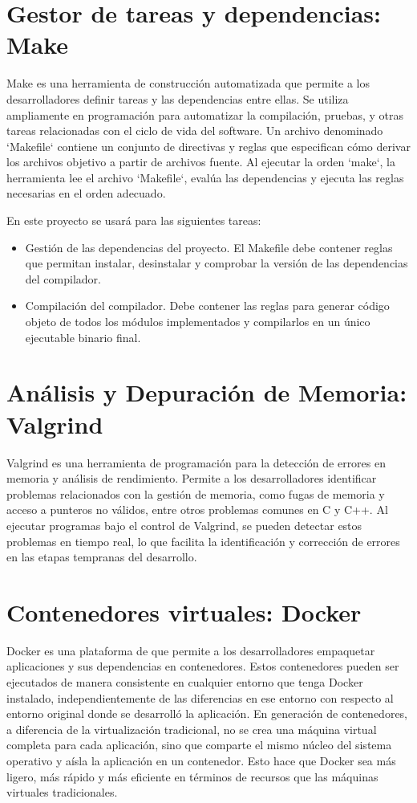 \section{Gestor de tareas y dependencias: Make}
Make es una herramienta de construcción automatizada que permite a los desarrolladores definir tareas y las dependencias entre ellas. Se utiliza ampliamente en programación para automatizar la compilación, pruebas, y otras tareas relacionadas con el ciclo de vida del software. Un archivo denominado `Makefile` contiene un conjunto de directivas y reglas que especifican cómo derivar los archivos objetivo a partir de archivos fuente. Al ejecutar la orden `make`, la herramienta lee el archivo `Makefile`, evalúa las dependencias y ejecuta las reglas necesarias en el orden adecuado.


\noindent
En este proyecto se usará para las siguientes tareas:
\begin{itemize}
    \item Gestión de las dependencias del proyecto. El Makefile debe contener reglas que permitan instalar, desinstalar y comprobar la versión de las dependencias del compilador.
    \item Compilación del compilador. Debe contener las reglas para generar código objeto de todos los módulos implementados y compilarlos en un único ejecutable binario final.
\end{itemize}

\section{Análisis y Depuración de Memoria: Valgrind}
Valgrind es una herramienta de programación para la detección de errores en memoria y análisis de rendimiento. Permite a los desarrolladores identificar problemas relacionados con la gestión de memoria, como fugas de memoria y acceso a punteros no válidos, entre otros problemas comunes en C y C++. Al ejecutar programas bajo el control de Valgrind, se pueden detectar estos problemas en tiempo real, lo que facilita la identificación y corrección de errores en las etapas tempranas del desarrollo.

\section{Contenedores virtuales: Docker}
Docker es una plataforma de que permite a los desarrolladores empaquetar aplicaciones y sus dependencias en contenedores. Estos contenedores pueden ser ejecutados de manera consistente en cualquier entorno que tenga Docker instalado, independientemente de las diferencias en ese entorno con respecto al entorno original donde se desarrolló la aplicación. En generación de contenedores, a diferencia de la virtualización tradicional, no se crea una máquina virtual completa para cada aplicación, sino que comparte el mismo núcleo del sistema operativo y aísla la aplicación en un contenedor. Esto hace que Docker sea más ligero, más rápido y más eficiente en términos de recursos que las máquinas virtuales tradicionales.


